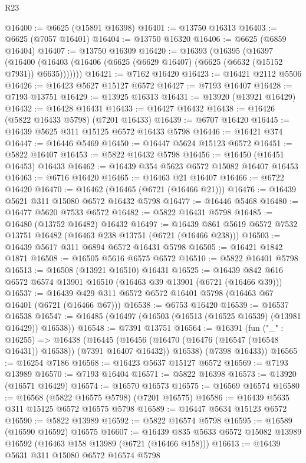 \begin{lexlean}{R23}
\begin{coremodule}
@16400 := @6625 (@15891 @16398)
@16401 := @13750 @16313
@16403 := @6625 (@7057 @16401)
@16404 := @13750 @16320
@16406 := @6625 (@6859 @16404)
@16407 := @13750 @16309
@16420 := @16393
    (@16395
      (@16397
        (@16400 (@16403 (@16406 (@6625 (@6629 @16407) (@6625 (@6632 (@15152 @7931)) @6635)))))))
@16421 := @7162 @16420
@16423 := @16421 @2112 @5506
@16426 := @16423 @5627 @15127 @6572
@16427 := @7193 @16407
@16428 := @7193 @13751
@16429 := @13925 @16313
@16431 := @13920 (@13921 @16429)
@16432 := @16428 @16431
@16433 := @16427 @16432
@16438 := @16426 (@5822 @16433 @5798) (@7201 @16433)
@16439 := @6707 @16420
@16445 := @16439 @5625 @311 @15125 @6572 @16433 @5798
@16446 := @16421 @374
@16447 := @16446 @5469
@16450 := @16447 @5624 @15123 @6572
@16451 := @5822 @16407
@16453 := @5822 @16432 @5798
@16456 := @16450 (@16451 @16453) @16433
@16462 := @16439 @354 @5623 @6572 @15082 @16407 @16453
@16463 := @6716 @16420
@16465 := @16463 @21 @16407
@16466 := @6722 @16420
@16470 := @16462 (@16465 (@6721 (@16466 @21)))
@16476 := @16439 @5621 @311 @15080 @6572 @16432 @5798
@16477 := @16446 @5468
@16480 := @16477 @5620 @7533 @6572
@16482 := @5822 @16431 @5798
@16485 := @16480 (@13752 @16482) @16432
@16497 := @16439 @861 @5619 @6572 @7532 @13751 @16482 (@16463 @238 @13751 (@6721 (@16466 @238)))
@16503 := @16439 @5617 @311 @6894 @6572 @16431 @5798
@16505 := @16421 @1842 @1871
@16508 := @16505 @5616 @6575 @6572
@16510 := @5822 @16401 @5798
@16513 := @16508 (@13921 @16510) @16431
@16525 := @16439 @842 @616 @6572 @6574 @13901 @16510 (@16463 @39 @13901 (@6721 (@16466 @39)))
@16537 := @16439 @429 @311 @6572 @6572 @16401 @5798 (@16463 @67 @16401 (@6721 (@16466 @67)))
@16538 := @6753 @16420
@16539 := @16537 @16538
@16547 := @16485 (@16497 (@16503 (@16513 (@16525 @16539) (@13981 @16429)) @16538))
@16548 := @7391 @13751
@16564 := @16391
    (fun ("_" : @16255) =>
    @16438
      (@16445
        (@16456 (@16470 (@16476 (@16547 (@16548 @16431)) @16538)) (@7391 @16407 @16432))
        @16538)
      (@7398 @16433))
@16565 := @16254 @7186
@16568 := @16423 @5637 @15127 @6572
@16569 := @7193 @13989
@16570 := @7193 @16404
@16571 := @5822 @16398
@16573 := @13920 (@16571 @16429)
@16574 := @16570 @16573
@16575 := @16569 @16574
@16580 := @16568 (@5822 @16575 @5798) (@7201 @16575)
@16586 := @16439 @5635 @311 @15125 @6572 @16575 @5798
@16589 := @16447 @5634 @15123 @6572
@16590 := @5822 @13989
@16592 := @5822 @16574 @5798
@16595 := @16589 (@16590 @16592) @16575
@16607 := @16439 @835 @5633 @6572 @15082 @13989 @16592 (@16463 @158 @13989 (@6721 (@16466 @158)))
@16613 := @16439 @5631 @311 @15080 @6572 @16574 @5798

\end{coremodule}
\end{lexlean}
